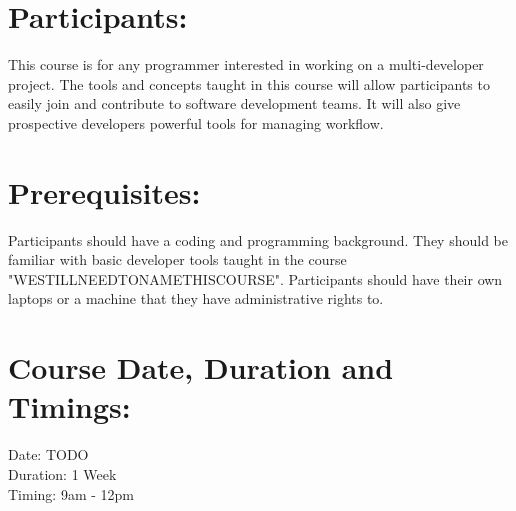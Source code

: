 \documentclass[a4paper,11pt]{article}
\begin{document}
\section{Participants:}
This course is for any programmer interested in working on a multi-developer project. The tools and concepts taught in this course will allow participants to easily join and contribute to software development teams. It will also give prospective developers powerful tools for managing workflow.

\section{Prerequisites:}
Participants should have a coding and programming background. They should be familiar with basic developer tools taught in the course "WESTILLNEEDTONAMETHISCOURSE". Participants should have their own laptops or a machine that they have administrative rights to.

\section{Course Date, Duration and Timings:}
Date: TODO\\
Duration: 1 Week\\
Timing: 9am - 12pm
\end{document}
